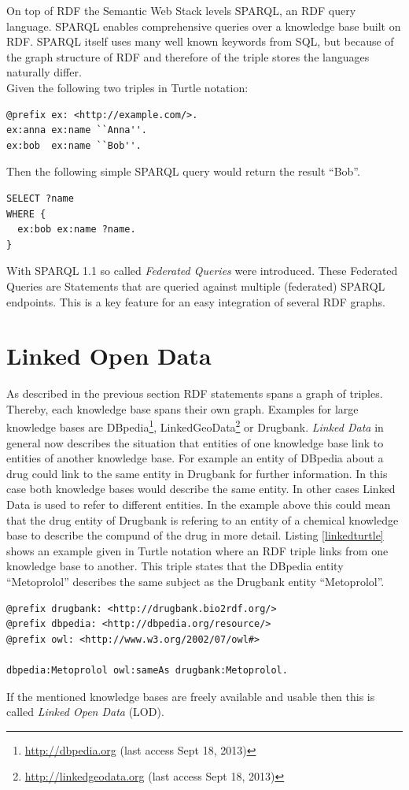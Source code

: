 On top of RDF the Semantic Web Stack levels SPARQL, an RDF query language.
SPARQL enables comprehensive queries over a knowledge base built on RDF.
SPARQL itself uses many well known keywords from SQL, but because of the graph structure of RDF and therefore of the triple stores the languages naturally differ.\\
Given the following two triples in Turtle notation:
\begin{lstlisting}[numbers=none,caption=Example Turtle triples]
@prefix ex: <http://example.com/>.
ex:anna ex:name ``Anna''.
ex:bob  ex:name ``Bob''. 
\end{lstlisting}
Then the following simple SPARQL query would return the result ``Bob''.
\begin{lstlisting}[numbers=none,caption=Example SPARQL query]
SELECT ?name
WHERE {
  ex:bob ex:name ?name.
}
\end{lstlisting}

With SPARQL 1.1 so called \textit{Federated Queries} were introduced.
These Federated Queries are Statements that are queried against multiple (federated) SPARQL endpoints.
This is a key feature for an easy integration of several RDF graphs.

\section{Linked Open Data}
\label{sec:linked-open-data}
As described in the previous section RDF statements spans a graph of triples.
Thereby, each knowledge base spans their own graph.
Examples for large knowledge bases are DBpedia\footnote{\url{http://dbpedia.org} (last access Sept 18, 2013)}, LinkedGeoData\footnote{\url{http://linkedgeodata.org} (last access Sept 18, 2013)} or Drugbank.
\textit{Linked Data} in general now describes the situation that entities of one knowledge base link to entities of another knowledge base.
For example an entity of DBpedia about a drug could link to the same entity in Drugbank for further information.
In this case both knowledge bases would describe the same entity.
In other cases Linked Data is used to refer to different entities.
In the example above this could mean that the drug entity of Drugbank is refering to an entity of a chemical knowledge base to describe the compund of the drug in more detail.
Listing \ref{linkedturtle} shows an example given in Turtle notation where an RDF triple links from one knowledge base to another.
This triple states that the DBpedia entity ``Metoprolol'' describes the same subject as the Drugbank entity ``Metoprolol''.
\begin{lstlisting}[numbers=none,caption=Example triple for linking two entities of different knowledge bases,label=linkedturtle]
@prefix drugbank: <http://drugbank.bio2rdf.org/>
@prefix dbpedia: <http://dbpedia.org/resource/>
@prefix owl: <http://www.w3.org/2002/07/owl#>

dbpedia:Metoprolol owl:sameAs drugbank:Metoprolol.
\end{lstlisting}
If the mentioned knowledge bases are freely available and usable then this is called \textit{Linked Open Data} (LOD).

